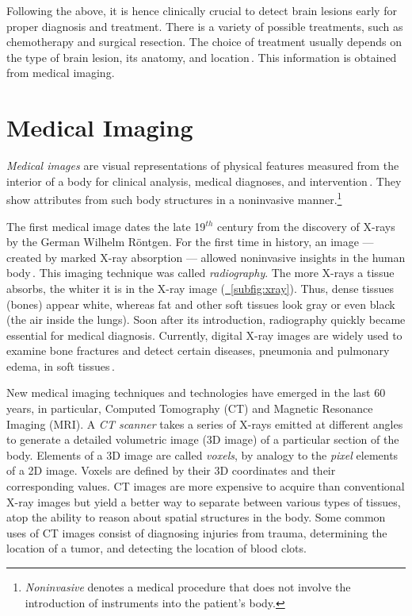 Following the above, it is hence clinically crucial to detect brain lesions early for proper diagnosis and treatment. There is a variety of possible treatments, such as chemotherapy and surgical resection. The choice of treatment usually depends on the type of brain lesion, its anatomy, and location\,\cite{Soltaninejad-2017-AutomatedBrainSuperpixel,Seghier-2008-LesionIdentification}. This information is obtained from medical imaging.


\section{Medical Imaging}
\label{sec:medical_images}
\emph{Medical images} are visual representations of physical features measured from the interior of a body for clinical analysis, medical diagnoses, and intervention\,\cite{Toennies-2017-Book-GuideToMedical}. They show attributes from such body structures in a noninvasive manner.\footnote{\emph{Noninvasive} denotes a medical procedure that does not involve the introduction of instruments into the patient’s body.}

The first medical image dates the late 19$^{th}$ century from the discovery of X-rays by the German Wilhelm Röntgen.
For the first time in history, an image --- created by marked X-ray absorption --- allowed noninvasive insights in the human body\,\cite{Bercovich-2018-Rambam-Medical}. This imaging technique was called \emph{radiography}. The more X-rays a tissue absorbs, the whiter it is in the X-ray image (\hyperref[subfig:xray]{\fig~\ref{subfig:xray}}). Thus, dense tissues (\eg bones) appear white, whereas fat and other soft tissues look gray or even black (\eg the air inside the lungs). Soon after its introduction, radiography quickly became essential for medical diagnosis. Currently, digital X-ray images are widely used to examine bone fractures and detect certain diseases, \eg pneumonia and pulmonary edema, in soft tissues\,\cite{Toennies-2017-Book-GuideToMedical}.

New medical imaging techniques and technologies have emerged in the last 60 years, in particular, Computed Tomography (CT) and Magnetic Resonance Imaging (MRI). A \emph{CT scanner} takes a series of X-rays emitted at different angles to generate a detailed volumetric image (3D image) of a particular section of the body. Elements of a 3D image are called \emph{voxels}, by analogy to the \emph{pixel} elements of a 2D image. Voxels are defined by their 3D coordinates and their corresponding values. CT images are more expensive to acquire than conventional X-ray images but yield a better way to separate between various types of tissues, atop the ability to reason about spatial structures in the body.
Some common uses of CT images consist of diagnosing injuries from trauma, determining the location of a tumor, and detecting the location of blood clots.

